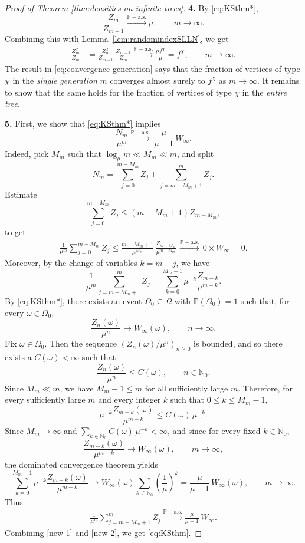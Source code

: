 \documentclass[11pt]{article}
\numberwithin{equation}{section}
\theoremstyle{plain}
\newcommand{\N}{\mathbb N}
\newcommand{\PP}{\mathbb{P}}
\begin{document}
\begin{proof}[Proof of Theorem \ref{thm:densities-on-infinite-trees}]
\medskip\noindent
{\bf 4.}
By \eqref{eq:KSthm*},
\[
\frac{Z_m}{Z_{m-1}} \stackrel{\PP-\mathrm{a.s.}}{\longrightarrow} \mu, \qquad m \to \infty.
\]
Combining this with Lemma~\ref{lem:randomindexSLLN}, we get
\begin{align}
\label{eq:convergence-generation}
\frac{Z_m^\chi}{Z_m}
&= \frac{Z_m^\chi}{Z_{m-1}} \, 
\frac{Z_{m-1}}{Z_m} \stackrel{\PP-\mathrm{a.s.}}{\longrightarrow} 
\frac{\mu f^\chi}{\mu} = f^{\chi}, \qquad m\to \infty.
\end{align}
The result in \eqref{eq:convergence-generation} says that the fraction of vertices of type $\chi$ in the \emph{single generation} $m$ converges almost surely to $f^\chi$ as $m\to\infty$. It remains to show that the same holds for the fraction of vertices of type $\chi$ in the \emph{entire tree}. 

\medskip\noindent
{\bf 5.}
First, we show that \eqref{eq:KSthm*} implies
\begin{equation}
\label{eq:KSthm}
\frac{N_m}{\mu^m} \stackrel{\PP-\mathrm{a.s.}}{\longrightarrow} \,\frac{\mu}{\mu-1}\, W_\infty.
\end{equation}
Indeed, pick $M_m$ such that $\log_\mu m \ll M_m \ll m$, and split
\[
N_m = \sum_{j=0}^{m-M_m} Z_j + \sum_{j=m-M_m+1}^m Z_j.
\]
Estimate
\[
\sum_{j=0}^{m-M_m} Z_j \leq (m-M_m+1) Z_{m-M_m},
\]
to get
\begin{align}
\label{new-1}
\frac{1}{\mu^m} \sum_{j=0}^{m-M_m} Z_j \leq \frac{m-M_m+1}{\mu^{M_m}}\,\frac{Z_{m-M_m}}{\mu^{m-M_m}}
\,\stackrel{\PP-\mathrm{a.s.}}{\longrightarrow}\, 0 \times W_\infty = 0.   
\end{align}
Moreover, by the change of variables $k=m-j$, we have
\[
\frac{1}{\mu^m}\sum_{j=m-M_m+1}^m Z_j
=
\sum_{k=0}^{M_m-1}\mu^{-k}\frac{Z_{m-k}}{\mu^{m-k}}.
\]
By \eqref{eq:KSthm*}, there exists an event $\Omega_0\subseteq \Omega$ with
$\PP(\Omega_0)=1$ such that, for every $\omega\in\Omega_0$,
\[
\frac{Z_n(\omega)}{\mu^n}\to W_\infty(\omega), \qquad n\to\infty.
\]
Fix $\omega\in\Omega_0$. Then the sequence $(Z_n(\omega)/\mu^n)_{n\geq 0}$ is bounded, and so there exists a $C(\omega)<\infty$ such that
\[
\frac{Z_n(\omega)}{\mu^n}\leq C(\omega), \qquad n\in \N_0.
\]
Since $M_m\ll m$, we have $M_m-1\leq m$ for all sufficiently large $m$. Therefore, for every sufficiently large $m$ and every integer $k$ such that $0\leq k\leq M_m-1$,
\[
\mu^{-k}\frac{Z_{m-k}(\omega)}{\mu^{m-k}} \leq C(\omega)\,\mu^{-k}.
\]
Since $M_m\to\infty$ and $\sum_{k\in\N_0}C(\omega)\,\mu^{-k}<\infty$, and since for every fixed $k\in\N_0$,
\[
\frac{Z_{m-k}(\omega)}{\mu^{m-k}}\to W_\infty(\omega),\qquad m\to\infty,
\]
the dominated convergence theorem yields
\[
\sum_{k=0}^{M_m-1}\mu^{-k}\frac{Z_{m-k}(\omega)}{\mu^{m-k}}
\to
W_{\infty}(\omega)\sum_{k\in\N_0} \left(\frac{1}{\mu}\right)^k = \frac{\mu}{\mu-1}\, W_\infty(\omega),\qquad m\to\infty.
\]
Thus
\begin{align}
\label{new-2}
\frac{1}{\mu^m} \sum_{j=m-M_m+1}^m Z_j 
\stackrel{\PP-\mathrm{a.s.}}{\longrightarrow} 
  \frac{\mu}{\mu-1}\, W_\infty.
\end{align}
Combining \eqref{new-1} and \eqref{new-2}, we get \eqref{eq:KSthm}. 


\end{proof}
\end{document}
